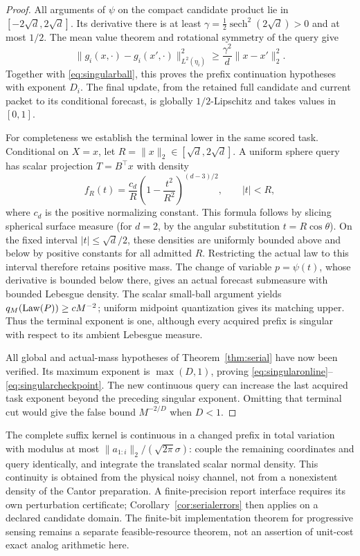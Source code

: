\begin{proof}
All arguments of $\psi$ on the compact candidate product lie in $[-2\sqrt d,2\sqrt d]$. Its derivative there is at least
$\gamma=\tfrac12\operatorname{sech}^2(2\sqrt d)>0$ and at most $1/2$. The mean value theorem and rotational symmetry of the query give
\[
 \|g_i(x,\cdot)-g_i(x',\cdot)\|_{L^2(\eta_i)}^2
 \ge\frac{\gamma^2}{d}\|x-x'\|_2^2.
\]
Together with \eqref{eq:singularball}, this proves the prefix continuation hypotheses with exponent $D_i$. The final update, from the retained full candidate and current packet to its conditional forecast, is globally $1/2$-Lipschitz and takes values in $[0,1]$.

For completeness we establish the terminal lower in the same scored task. Conditional on $X=x$, let $R=\|x\|_2\in[\sqrt d,2\sqrt d]$. A uniform sphere query has scalar projection $T=B^\top x$ with density
\[
 f_R(t)=\frac{c_d}{R}\left(1-\frac{t^2}{R^2}\right)^{(d-3)/2},
 \qquad |t|<R,
\]
where $c_d$ is the positive normalizing constant. This formula follows by slicing spherical surface measure (for $d=2$, by the angular substitution $t=R\cos\theta$). On the fixed interval $|t|\le\sqrt d/2$, these densities are uniformly bounded above and below by positive constants for all admitted $R$. Restricting the actual law to this interval therefore retains positive mass. The change of variable $p=\psi(t)$, whose derivative is bounded below there, gives an actual forecast submeasure with bounded Lebesgue density. The scalar small-ball argument yields $q_M(\operatorname{Law}(P))\ge cM^{-2}$; uniform midpoint quantization gives its matching upper. Thus the terminal exponent is one, although every acquired prefix is singular with respect to its ambient Lebesgue measure.

All global and actual-mass hypotheses of Theorem~\ref{thm:serial} have now been verified. Its maximum exponent is $\max(D,1)$, proving \eqref{eq:singularonline}--\eqref{eq:singularcheckpoint}. The new continuous query can increase the last acquired task exponent beyond the preceding singular exponent. Omitting that terminal cut would give the false bound $M^{-2/D}$ when $D<1$.
\end{proof}

The complete suffix kernel is continuous in a changed prefix in total variation with modulus at most $\|a_{1:i}\|_2/(\sqrt{2\pi}\sigma)$: couple the remaining coordinates and query identically, and integrate the translated scalar normal density. This continuity is obtained from the physical noisy channel, not from a nonexistent density of the Cantor preparation. A finite-precision report interface requires its own perturbation certificate; Corollary~\ref{cor:serialerrors} then applies on a declared candidate domain. The finite-bit implementation theorem for progressive sensing remains a separate feasible-resource theorem, not an assertion of unit-cost exact analog arithmetic here.
